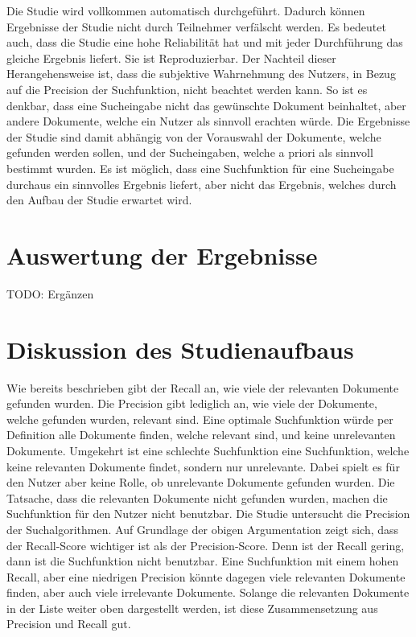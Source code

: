 Die Studie wird vollkommen automatisch durchgeführt.
Dadurch können Ergebnisse der Studie nicht durch Teilnehmer verfälscht werden.
Es bedeutet auch, dass die Studie eine hohe Reliabilität hat und mit jeder Durchführung das gleiche Ergebnis liefert.
Sie ist Reproduzierbar.
Der Nachteil dieser Herangehensweise ist, dass die subjektive Wahrnehmung des Nutzers, in Bezug auf die Precision der Suchfunktion, nicht beachtet werden kann.
So ist es denkbar, dass eine Sucheingabe nicht das gewünschte Dokument beinhaltet, aber andere Dokumente, welche ein Nutzer als sinnvoll erachten würde.
Die Ergebnisse der Studie sind damit abhängig von der Vorauswahl der Dokumente, welche gefunden werden sollen, und der Sucheingaben, welche a priori als sinnvoll bestimmt wurden.
Es ist möglich, dass eine Suchfunktion für eine Sucheingabe durchaus ein sinnvolles Ergebnis liefert, aber nicht das Ergebnis, welches durch den Aufbau der Studie erwartet wird.

\section{Auswertung der Ergebnisse}
TODO: Ergänzen

\section{Diskussion des Studienaufbaus}

Wie bereits beschrieben gibt der Recall an, wie viele der relevanten Dokumente gefunden wurden.
Die Precision gibt lediglich an, wie viele der Dokumente, welche gefunden wurden, relevant sind.
Eine optimale Suchfunktion würde per Definition alle Dokumente finden, welche relevant sind, und keine unrelevanten Dokumente.
Umgekehrt ist eine schlechte Suchfunktion eine Suchfunktion, welche keine relevanten Dokumente findet, sondern nur unrelevante.
Dabei spielt es für den Nutzer aber keine Rolle, ob unrelevante Dokumente gefunden wurden.
Die Tatsache, dass die relevanten Dokumente nicht gefunden wurden, machen die Suchfunktion für den Nutzer nicht benutzbar. 
Die Studie untersucht die Precision der Suchalgorithmen.
Auf Grundlage der obigen Argumentation zeigt sich, dass der Recall-Score wichtiger ist als der Precision-Score.
Denn ist der Recall gering, dann ist die Suchfunktion nicht benutzbar.
Eine Suchfunktion mit einem hohen Recall, aber eine niedrigen Precision könnte dagegen viele relevanten Dokumente finden, aber auch viele irrelevante Dokumente.
Solange die relevanten Dokumente in der Liste weiter oben dargestellt werden, ist diese Zusammensetzung aus Precision und Recall gut.\\

